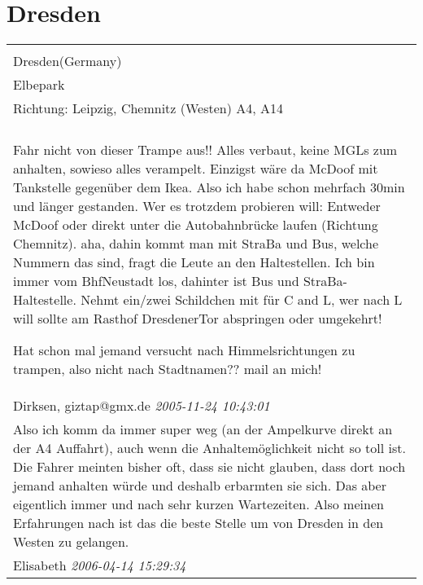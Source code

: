 \documentclass[a4paper,12pt]{article}
\begin{document}
\section{Dresden}
\begin{tabular}{|p{13cm}|}
\hline\\
Dresden(Germany)\\
Elbepark\\
Richtung: Leipzig, Chemnitz (Westen) A4, A14 \\
\hline\\
Fahr nicht von dieser Trampe aus!! Alles verbaut, keine MGLs zum anhalten, sowieso alles verampelt. Einzigst wäre da McDoof mit Tankstelle gegenüber dem Ikea. Also ich habe schon mehrfach 30min und länger gestanden. Wer es trotzdem probieren will: Entweder McDoof oder direkt unter die Autobahnbrücke laufen (Richtung Chemnitz). aha, dahin kommt man mit StraBa und Bus, welche Nummern das sind, fragt die Leute an den Haltestellen. Ich bin immer vom BhfNeustadt los, dahinter ist Bus und StraBa-Haltestelle. Nehmt ein/zwei Schildchen mit für C and L, wer nach L will sollte am Rasthof DresdenerTor abspringen oder umgekehrt!

Hat schon mal jemand versucht nach Himmelsrichtungen zu trampen, also nicht nach Stadtnamen?? mail an mich! \\
Dirksen, giztap@gmx.de \textit{ 2005-11-24 10:43:01 }\\\hline Also ich komm da immer super weg (an der Ampelkurve direkt an der A4 Auffahrt), auch wenn die Anhaltemöglichkeit nicht so toll ist. Die Fahrer meinten bisher oft, dass sie nicht glauben, dass dort noch jemand anhalten würde und deshalb erbarmten sie sich. Das aber eigentlich immer und nach sehr kurzen Wartezeiten. Also meinen Erfahrungen nach ist das die beste Stelle um von Dresden in den Westen zu gelangen.
\\
Elisabeth \textit{ 2006-04-14 15:29:34 }\\\hline
\end{tabular}
\end{document}
